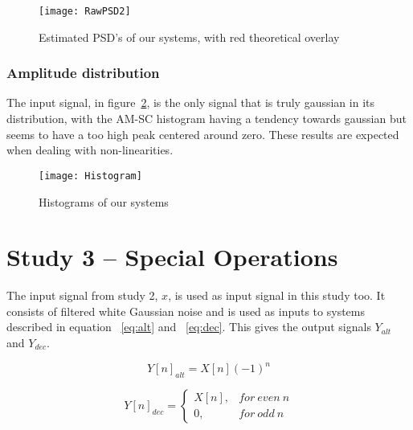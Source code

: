 \documentclass[10pt]{article}
\begin{document}
\begin{figure}[!hp]

    \begin{center}
      \texttt{[image: RawPSD2]}
    \caption{Estimated PSD's of our systems, with red theoretical overlay \label{fig:RawPSD2}}
    \end{center}

\end{figure}

\subsubsection{Amplitude distribution}
The input signal, in figure~\ref{fig:hist}, is the only signal that is truly gaussian in its distribution,
with the AM-SC histogram having a tendency towards gaussian but seems to have a
too high peak centered around zero. These results are expected when dealing with
non-linearities.

\begin{figure}[!hp]

    \begin{center}
      \texttt{[image: Histogram]}
    \caption{Histograms of our systems \label{fig:hist}}
    \end{center}

\end{figure}


\clearpage

\section{Study 3 – Special Operations}
The input signal from study 2, $x$, is used as input signal in this study too. It consists of
filtered white Gaussian noise and is used as inputs to systems described in equation ~\ref{eq:alt}
and ~\ref{eq:dec}. This gives the output signals $Y_{alt}$ and $Y_{dec}$.

\begin{equation}
  \label{eq:alt}
  Y[n]_{alt} =X[n](-1)^n
\end{equation}

\begin{equation}
  \label{eq:dec}
  Y[n]_{dec} =
\begin{cases}
   X[n],& for~even~n\\
    0,    & for~odd~n
\end{cases}
\end{equation}
\end{document}
